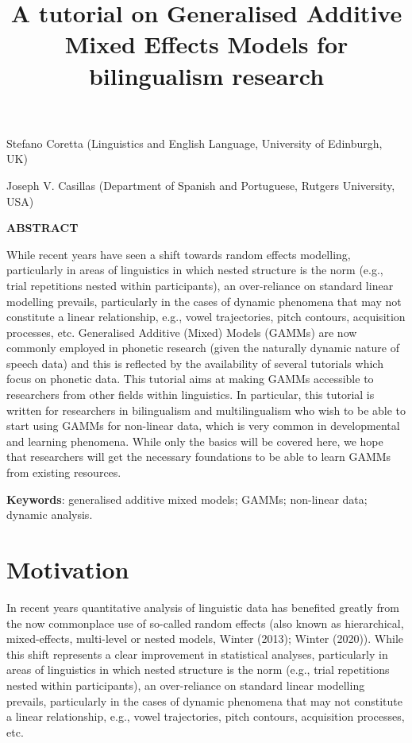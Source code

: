 \documentclass[
  letterpaper,
  DIV=11,
  numbers=noendperiod]{scrartcl}
\title{A tutorial on Generalised Additive Mixed Effects Models for
bilingualism research}
\author{}
\date{}
\begin{document}
\maketitle


Stefano Coretta (Linguistics and English Language, University of
Edinburgh, UK)

Joseph V. Casillas (Department of Spanish and Portuguese, Rutgers
University, USA)

\textbf{ABSTRACT}

While recent years have seen a shift towards random effects modelling,
particularly in areas of linguistics in which nested structure is the
norm (e.g., trial repetitions nested within participants), an
over-reliance on standard linear modelling prevails, particularly in the
cases of dynamic phenomena that may not constitute a linear
relationship, e.g., vowel trajectories, pitch contours, acquisition
processes, etc. Generalised Additive (Mixed) Models (GAMMs) are now
commonly employed in phonetic research (given the naturally dynamic
nature of speech data) and this is reflected by the availability of
several tutorials which focus on phonetic data. This tutorial aims at
making GAMMs accessible to researchers from other fields within
linguistics. In particular, this tutorial is written for researchers in
bilingualism and multilingualism who wish to be able to start using
GAMMs for non-linear data, which is very common in developmental and
learning phenomena. While only the basics will be covered here, we hope
that researchers will get the necessary foundations to be able to learn
GAMMs from existing resources.

\textbf{Keywords}: generalised additive mixed models; GAMMs; non-linear
data; dynamic analysis.

\section{Motivation}\label{motivation}

In recent years quantitative analysis of linguistic data has benefited
greatly from the now commonplace use of so-called random effects (also
known as hierarchical, mixed-effects, multi-level or nested models,
Winter (2013); Winter (2020)). While this shift represents a clear
improvement in statistical analyses, particularly in areas of
linguistics in which nested structure is the norm (e.g., trial
repetitions nested within participants), an over-reliance on standard
linear modelling prevails, particularly in the cases of dynamic
phenomena that may not constitute a linear relationship, e.g., vowel
trajectories, pitch contours, acquisition processes, etc.
\end{document}
